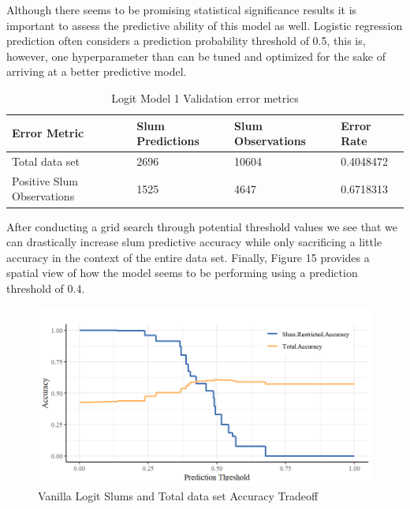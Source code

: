 Although there seems to be promising statistical significance results it is important to assess the predictive ability of this model as well. Logistic regression prediction often considers a prediction probability threshold of 0.5, this is, however, one hyperparameter than can be tuned and optimized for the sake of arriving at a better predictive model. 

\begin{table}[ht]
\centering
\caption{Logit Model 1 Validation error metrics}
\begin{tabular}{llll}
  \hline \hline 
  Error Metric &  Slum Predictions &  Slum Observations  & Error Rate \\ 
  \hline
Total data set & 2696 & 10604 & 0.4048472 \\ 
Positive Slum Observations & 1525 & 4647 & 0.6718313\\
   \hline
\end{tabular}
\end{table}

After conducting a grid search through potential threshold values we see that we can drastically increase slum predictive accuracy while only sacrificing a little accuracy in the context of the entire data set. Finally, Figure 15 provides a spatial view of how the model seems to be performing using a prediction threshold of 0.4.

\begin{figure}
    \centering
    \includegraphics[scale = 0.8]{Graphics/Vanilla Slums and Total Dataset Accuracy Tradeoff.png}
    \caption{Vanilla Logit Slums and Total data set Accuracy Tradeoff}
    \label{fig:vanillaModelTradeoff}
\end{figure}

